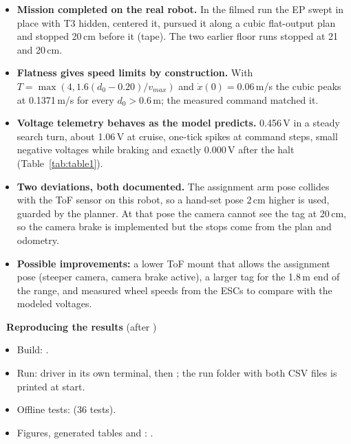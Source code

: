 \begin{itemize}
  \item \textbf{Mission completed on the real robot.} In the filmed run the EP swept in place with T3 hidden, centered
        it, pursued it along a cubic flat-output plan and stopped 20\,cm before it (tape). The two earlier floor runs
        stopped at 21 and 20\,cm.
  \item \textbf{Flatness gives speed limits by construction.} With $T=\max(4,1.6(d_0-0.20)/v_{max})$ and
        $\dot x(0)=0.06$\,m/s the cubic peaks at 0.1371\,m/s for every $d_0>0.6$\,m; the measured command matched it.
  \item \textbf{Voltage telemetry behaves as the model predicts.} 0.456\,V in a steady search turn, about 1.06\,V at
        cruise, one-tick spikes at command steps, small negative voltages while braking and exactly 0.000\,V after the
        halt (Table~\ref{tab:table1}).
  \item \textbf{Two deviations, both documented.} The assignment arm pose collides with the ToF sensor on this robot, so
        a hand-set pose 2\,cm higher is used, guarded by the planner. At that pose the camera cannot see the tag at
        20\,cm, so the camera brake is implemented but the stops come from the plan and odometry.
  \item \textbf{Possible improvements:} a lower ToF mount that allows the assignment pose (steeper camera, camera
        brake active), a larger tag for the 1.8\,m end of the range, and measured wheel speeds from the ESCs to compare
        with the modeled voltages.
\end{itemize}

\begin{notebox}
\small\textbf{\color{kfupmdark}\faFolderOpen\ Reproducing the results} (after )
\begin{itemize}
  \item Build: .
  \item Run: driver in its own terminal, then ; the run folder with
        both CSV files is printed at start.
  \item Offline tests:  (36 tests).
  \item Figures, generated tables and : .
\end{itemize}
\end{notebox}

